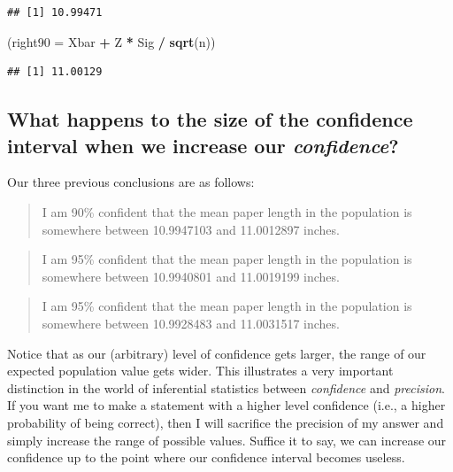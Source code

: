 \documentclass[
]{book}
\newenvironment{Shaded}{\begin{snugshade}}{\end{snugshade}}
\newcommand{\AttributeTok}[1]{\textcolor[rgb]{0.13,0.29,0.53}{#1}}
\newcommand{\FunctionTok}[1]{\textcolor[rgb]{0.13,0.29,0.53}{\textbf{#1}}}
\newcommand{\NormalTok}[1]{#1}
\newcommand{\SpecialCharTok}[1]{\textcolor[rgb]{0.81,0.36,0.00}{\textbf{#1}}}
\begin{document}
\begin{verbatim}
## [1] 10.99471
\end{verbatim}

\begin{Shaded}
\begin{Highlighting}[]
\NormalTok{(}\AttributeTok{right90 =}\NormalTok{ Xbar }\SpecialCharTok{+}\NormalTok{ Z }\SpecialCharTok{*}\NormalTok{ Sig }\SpecialCharTok{/} \FunctionTok{sqrt}\NormalTok{(n))}
\end{Highlighting}
\end{Shaded}

\begin{verbatim}
## [1] 11.00129
\end{verbatim}

\subsection{\texorpdfstring{What happens to the size of the confidence interval when we increase our \emph{confidence}?}{What happens to the size of the confidence interval when we increase our confidence?}}\label{what-happens-to-the-size-of-the-confidence-interval-when-we-increase-our-confidence}

Our three previous conclusions are as follows:

\begin{quote}
I am 90\% confident that the mean paper length in the population is somewhere between 10.9947103 and 11.0012897 inches.
\end{quote}

\begin{quote}
I am 95\% confident that the mean paper length in the population is somewhere between 10.9940801 and 11.0019199 inches.
\end{quote}

\begin{quote}
I am 95\% confident that the mean paper length in the population is somewhere between 10.9928483 and 11.0031517 inches.
\end{quote}

Notice that as our (arbitrary) level of confidence gets larger, the range of our expected population value gets wider. This illustrates a very important distinction in the world of inferential statistics between \emph{confidence} and \emph{precision}. If you want me to make a statement with a higher level confidence (i.e., a higher probability of being correct), then I will sacrifice the precision of my answer and simply increase the range of possible values. Suffice it to say, we can increase our confidence up to the point where our confidence interval becomes useless.
\end{document}
